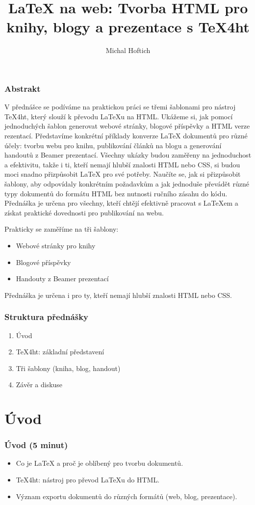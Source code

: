 \documentclass{beamer}
\title{LaTeX na web: Tvorba HTML pro knihy, blogy a prezentace s TeX4ht}
\author{Michal Hoftich}
\date{}
\begin{document}
\frame{\titlepage}

\begin{frame}
\frametitle{Abstrakt}
V přednášce se podíváme na praktickou práci se třemi šablonami pro nástroj
TeX4ht, který slouží k převodu LaTeXu na HTML. Ukážeme si, jak pomocí
jednoduchých šablon generovat webové stránky, blogové příspěvky a HTML verze
rezentací. Představíme konkrétní příklady konverze LaTeX dokumentů pro různé
účely: tvorbu webu pro knihu, publikování článků na blogu a generování handoutů
z Beamer prezentací. Všechny ukázky budou zaměřeny na jednoduchost a
efektivitu, takže i ti, kteří nemají hlubší znalosti HTML nebo CSS, si budou
moci snadno přizpůsobit LaTeX pro své potřeby. Naučíte se, jak si přizpůsobit
šablony, aby odpovídaly konkrétním požadavkům a jak jednoduše převádět různé
typy dokumentů do formátu HTML bez nutnosti ručního zásahu do kódu. Přednáška
je určena pro všechny, kteří chtějí efektivně pracovat s LaTeXem a získat
praktické dovednosti pro publikování na webu.

Prakticky se zaměříme na tři šablony:
\begin{itemize}
    \item Webové stránky pro knihy
    \item Blogové příspěvky
    \item Handouty z Beamer prezentací
\end{itemize}
Přednáška je určena i pro ty, kteří nemají hlubší znalosti HTML nebo CSS.
\end{frame}

\begin{frame}
\frametitle{Struktura přednášky}
\begin{enumerate}
    \item Úvod
    \item TeX4ht: základní představení
    \item Tři šablony (kniha, blog, handout)
    \item Závěr a diskuse
\end{enumerate}
\end{frame}

\section{Úvod}
\begin{frame}
\frametitle{Úvod (5 minut)}
\begin{itemize}
    \item Co je LaTeX a proč je oblíbený pro tvorbu dokumentů.
    \item TeX4ht: nástroj pro převod LaTeXu do HTML.
    \item Význam exportu dokumentů do různých formátů (web, blog, prezentace).
\end{itemize}
\end{frame}
\end{document}
